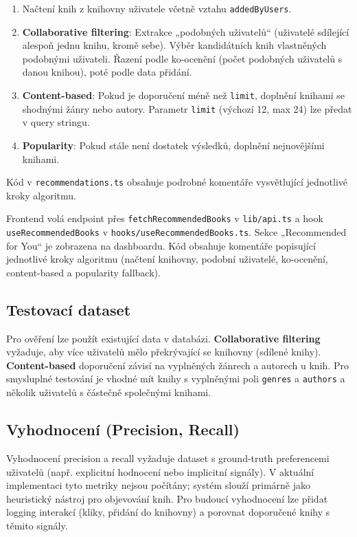 \begin{enumerate}
  \item Načtení knih z knihovny uživatele včetně vztahu \texttt{addedByUsers}.
  \item \textbf{Collaborative filtering}: Extrakce „podobných uživatelů“ (uživatelé sdílející alespoň jednu knihu, kromě sebe). Výběr kandidátních knih vlastněných podobnými uživateli. Řazení podle ko-ocenění (počet podobných uživatelů s danou knihou), poté podle data přidání.
  \item \textbf{Content-based}: Pokud je doporučení méně než \texttt{limit}, doplnění knihami se shodnými žánry nebo autory. Parametr \texttt{limit} (výchozí 12, max 24) lze předat v query stringu.
  \item \textbf{Popularity}: Pokud stále není dostatek výsledků, doplnění nejnovějšími knihami.
\end{enumerate}

Kód v \texttt{recommendations.ts} obsahuje podrobné komentáře vysvětlující jednotlivé kroky algoritmu.

Frontend volá endpoint přes \texttt{fetchRecommendedBooks} v \texttt{lib/api.ts} a hook \texttt{useRecommendedBooks} v \texttt{hooks/useRecommendedBooks.ts}. Sekce „Recommended for You“ je zobrazena na dashboardu. Kód obsahuje komentáře popisující jednotlivé kroky algoritmu (načtení knihovny, podobní uživatelé, ko-ocenění, content-based a popularity fallback).


\subsection{Testovací dataset}
Pro ověření lze použít existující data v databázi. \textbf{Collaborative filtering} vyžaduje, aby více uživatelů mělo překrývající se knihovny (sdílené knihy). \textbf{Content-based} doporučení závisí na vyplněných žánrech a autorech u knih. Pro smysluplné testování je vhodné mít knihy s vyplněnými poli \texttt{genres} a \texttt{authors} a několik uživatelů s částečně společnými knihami.


\subsection{Vyhodnocení (Precision, Recall)}
Vyhodnocení precision a recall vyžaduje dataset s ground-truth preferencemi uživatelů (např. explicitní hodnocení nebo implicitní signály). V aktuální implementaci tyto metriky nejsou počítány; systém slouží primárně jako heuristický nástroj pro objevování knih. Pro budoucí vyhodnocení lze přidat logging interakcí (kliky, přidání do knihovny) a porovnat doporučené knihy s těmito signály.


